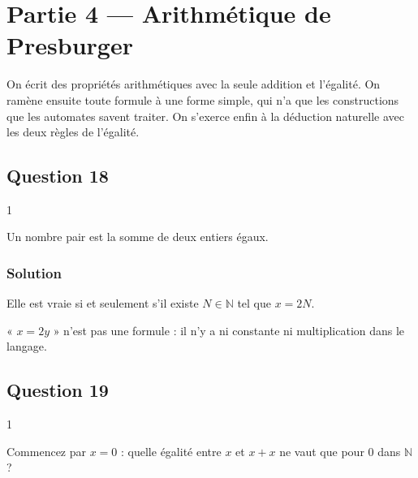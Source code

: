 \documentclass[11pt,a4paper]{article}
\newcommand{\equationajustee}[1]{%
  \sbox{\boiteequation}{$\displaystyle #1$}%
  \ifdim\wd\boiteequation>\linewidth
    \[\resizebox{\linewidth}{!}{\usebox{\boiteequation}}\]%
  \else
    \[#1\]%
  \fi}
\begin{document}
\hypertarget{partie-4-arithmuxe9tique-de-presburger}{%
\section{Partie 4 --- Arithmétique de Presburger}\label{partie-4-arithmuxe9tique-de-presburger}}

On écrit des propriétés arithmétiques avec la seule addition et l'égalité. On ramène ensuite toute formule à une forme simple, qui n'a que les constructions que les automates savent traiter. On s'exerce enfin à la déduction naturelle avec les deux règles de l'égalité.

\hypertarget{question-18}{%
\subsection{Question 18}\label{question-18}}

\begin{indication}{1}

Un nombre pair est la somme de deux entiers égaux.

\end{indication}

\hypertarget{solution-17}{%
\subsubsection{Solution}\label{solution-17}}

\equationajustee{\boxed{{\mathrm{div}}_2(x):=\exists y.\ x=y+y}}

Elle est vraie si et seulement s'il existe \(N\in\mathbb{N}\) tel que \(x=2N\).

\begin{piege}

« \(x=2y\) » n'est pas une formule : il n'y a ni constante ni multiplication dans le langage.

\end{piege}

\hypertarget{question-19}{%
\subsection{Question 19}\label{question-19}}

\begin{indication}{1}

Commencez par \(x=0\) : quelle égalité entre \(x\) et \(x+x\) ne vaut que pour \(0\) dans \(\mathbb{N}\) ?

\end{indication}
\end{document}
